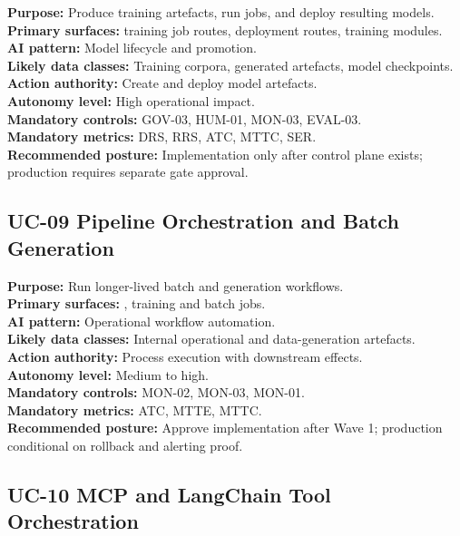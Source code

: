 \documentclass[11pt,a4paper]{article}
\begin{document}
\textbf{Purpose:} Produce training artefacts, run jobs, and deploy resulting models.\\
\textbf{Primary surfaces:} training job routes, deployment routes, training modules.\\
\textbf{AI pattern:} Model lifecycle and promotion.\\
\textbf{Likely data classes:} Training corpora, generated artefacts, model checkpoints.\\
\textbf{Action authority:} Create and deploy model artefacts.\\
\textbf{Autonomy level:} High operational impact.\\
\textbf{Mandatory controls:} GOV-03, HUM-01, MON-03, EVAL-03.\\
\textbf{Mandatory metrics:} DRS, RRS, ATC, MTTC, SER.\\
\textbf{Recommended posture:} Implementation only after control plane exists; production requires separate gate approval.

\subsection{UC-09 Pipeline Orchestration and Batch Generation}

\textbf{Purpose:} Run longer-lived batch and generation workflows.\\
\textbf{Primary surfaces:} , training and batch jobs.\\
\textbf{AI pattern:} Operational workflow automation.\\
\textbf{Likely data classes:} Internal operational and data-generation artefacts.\\
\textbf{Action authority:} Process execution with downstream effects.\\
\textbf{Autonomy level:} Medium to high.\\
\textbf{Mandatory controls:} MON-02, MON-03, MON-01.\\
\textbf{Mandatory metrics:} ATC, MTTE, MTTC.\\
\textbf{Recommended posture:} Approve implementation after Wave 1; production conditional on rollback and alerting proof.

\subsection{UC-10 MCP and LangChain Tool Orchestration}
\end{document}
